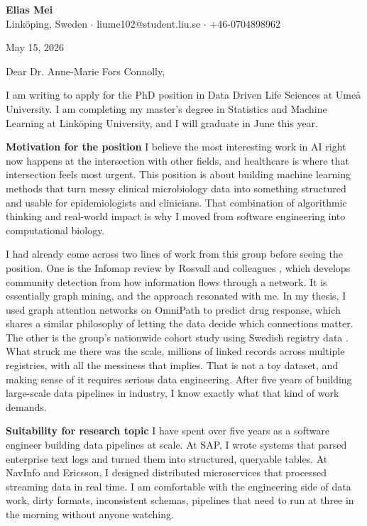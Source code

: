 \documentclass[11pt,a4paper]{article}
\begin{document}
\begin{center}
    {\LARGE \textbf{Elias Mei}} \\
    \vspace{2mm}
    Linköping, Sweden $\cdot$ liume102@student.liu.se $\cdot$ +46-0704898962
    \vspace{4mm}
\end{center}

\begin{flushright}
May 15, 2026
\end{flushright}


Dear Dr. Anne-Marie Fors Connolly,

I am writing to apply for the PhD position in Data Driven Life Sciences at Umeå University. I am completing my master's degree in Statistics and Machine Learning at Linköping University, and I will graduate in June this year.

\textbf{Motivation for the position} I believe the most interesting work in AI right now happens at the intersection with other fields, and healthcare is where that intersection feels most urgent. This position is about building machine learning methods that turn messy clinical microbiology data into something structured and usable for epidemiologists and clinicians. That combination of algorithmic thinking and real-world impact is why I moved from software engineering into computational biology.

I had already come across two lines of work from this group before seeing the position. One is the Infomap review by Rosvall and colleagues \cite{smiljanic2025mapequation}, which develops community detection from how information flows through a network. It is essentially graph mining, and the approach resonated with me. In my thesis, I used graph attention networks on OmniPath to predict drug response, which shares a similar philosophy of letting the data decide which connections matter. The other is the group's nationwide cohort study using Swedish registry data \cite{jakobsson2025hepatitis}. What struck me there was the scale, millions of linked records across multiple registries, with all the messiness that implies. That is not a toy dataset, and making sense of it requires serious data engineering. After five years of building large-scale data pipelines in industry, I know exactly what that kind of work demands.

\textbf{Suitability for research topic} I have spent over five years as a software engineer building data pipelines at scale. At SAP, I wrote systems that parsed enterprise text logs and turned them into structured, queryable tables. At NavInfo and Ericsson, I designed distributed microservices that processed streaming data in real time. I am comfortable with the engineering side of data work, dirty formats, inconsistent schemas, pipelines that need to run at three in the morning without anyone watching.
\end{document}
